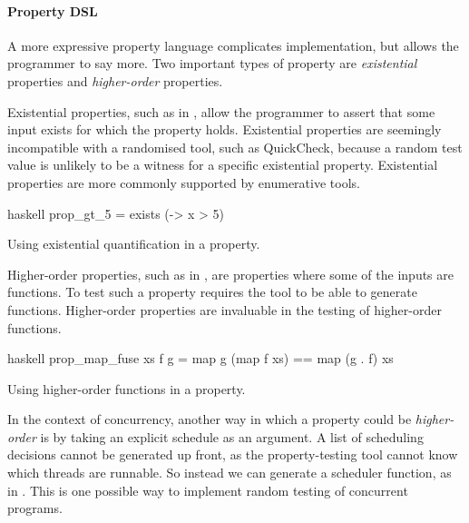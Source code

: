 \paragraph{Property DSL}
A more expressive property language complicates implementation, but
allows the programmer to say more.  Two important types of property
are \emph{existential} properties and \emph{higher-order} properties.

Existential properties, such as in , allow the
programmer to assert that some input exists for which the property
holds.  Existential properties are seemingly incompatible with a
randomised tool, such as QuickCheck, because a random test value is
unlikely to be a witness for a specific existential property.
Existential properties are more commonly supported by enumerative
tools.

\begin{listing}
\centering
\begin{cminted}{haskell}
prop_gt_5 = exists (\x -> x > 5)
\end{cminted}
\caption{Using existential quantification in a property.}\label{lst:prop_gt_5}
\end{listing}

Higher-order properties, such as in , are
properties where some of the inputs are functions.  To test such a
property requires the tool to be able to generate functions.
Higher-order properties are invaluable in the testing of higher-order
functions.

\begin{listing}
\centering
\begin{cminted}{haskell}
prop_map_fuse xs f g = map g (map f xs) == map (g . f) xs
\end{cminted}
\caption{Using higher-order functions in a property.}\label{lst:prop_map_fuse}
\end{listing}

In the context of concurrency, another way in which a property could
be \emph{higher-order} is by taking an explicit schedule as an
argument.  A list of scheduling decisions cannot be generated up
front, as the property-testing tool cannot know which threads are
runnable.  So instead we can generate a scheduler function, as in
\cite{ankuzik2014}.  This is one possible way to implement random
testing of concurrent programs.

